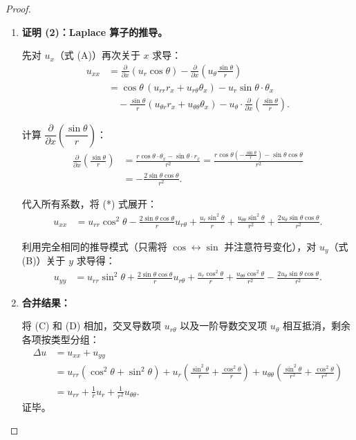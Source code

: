 \documentclass[lang=cn,11pt]{elegantbook}
\begin{document}
\begin{proof}
\begin{enumerate}
  \item \textbf{证明 (2)：Laplace 算子的推导。}
  
  先对 $u_x$（式 (A)）再次关于 $x$ 求导：
  \begin{align*}
  u_{xx}&=\frac{\partial}{\partial x}(u_r\cos\theta)-\frac{\partial}{\partial x}\!\left(u_\theta\frac{\sin\theta}{r}\right)\\[4pt]
  &=\cos\theta\,(u_{rr}r_x+u_{r\theta}\theta_x) -u_r\sin\theta\cdot\theta_x\\[4pt]
  &\quad-\frac{\sin\theta}{r}(u_{\theta r}r_x+u_{\theta\theta}\theta_x) -u_\theta\cdot\frac{\partial}{\partial x}\!\left(\frac{\sin\theta}{r}\right). \tag{*}
  \end{align*}
  
  计算 $\dfrac{\partial}{\partial x}\!\left(\dfrac{\sin\theta}{r}\right)$：
  \begin{align*}
  \frac{\partial}{\partial x}\!\left(\frac{\sin\theta}{r}\right)
  &=\frac{r\cos\theta\cdot\theta_x-\sin\theta\cdot r_x}{r^2}
  =\frac{r\cos\theta\left(-\frac{\sin\theta}{r}\right)-\sin\theta\cos\theta}{r^2}\\[6pt]
  &=-\frac{2\sin\theta\cos\theta}{r^2}.
  \end{align*}
  
  代入所有系数，将 (*) 式展开：
  \begin{align*}
  u_{xx}&=u_{rr}\cos^2\theta-\frac{2\sin\theta\cos\theta}{r}u_{r\theta}
  +\frac{u_r\sin^2\theta}{r}
  +\frac{u_{\theta\theta}\sin^2\theta}{r^2}
  +\frac{2u_\theta\sin\theta\cos\theta}{r^2}. \tag{C}
  \end{align*}
  
  利用完全相同的推导模式（只需将 $\cos\leftrightarrow\sin$ 并注意符号变化），对 $u_y$（式 (B)）关于 $y$ 求导得：
  \begin{align*}
  u_{yy}&=u_{rr}\sin^2\theta+\frac{2\sin\theta\cos\theta}{r}u_{r\theta}
  +\frac{u_r\cos^2\theta}{r}
  +\frac{u_{\theta\theta}\cos^2\theta}{r^2}
  -\frac{2u_\theta\sin\theta\cos\theta}{r^2}. \tag{D}
  \end{align*}

  \item \textbf{合并结果：}
  
  将 (C) 和 (D) 相加，交叉导数项 $u_{r\theta}$ 以及一阶导数交叉项 $u_\theta$ 相互抵消，剩余各项按类型分组：
  \begin{align*}
  \Delta u&=u_{xx}+u_{yy}\\[4pt]
  &=u_{rr}(\cos^2\theta+\sin^2\theta)
  +u_r\left(\frac{\sin^2\theta}{r}+\frac{\cos^2\theta}{r}\right)
  +u_{\theta\theta}\left(\frac{\sin^2\theta}{r^2}+\frac{\cos^2\theta}{r^2}\right)\\[6pt]
  &=u_{rr}+\frac{1}{r}u_r+\frac{1}{r^2}u_{\theta\theta}.
  \end{align*}
  证毕。
\end{enumerate}
\end{proof}
\end{document}
